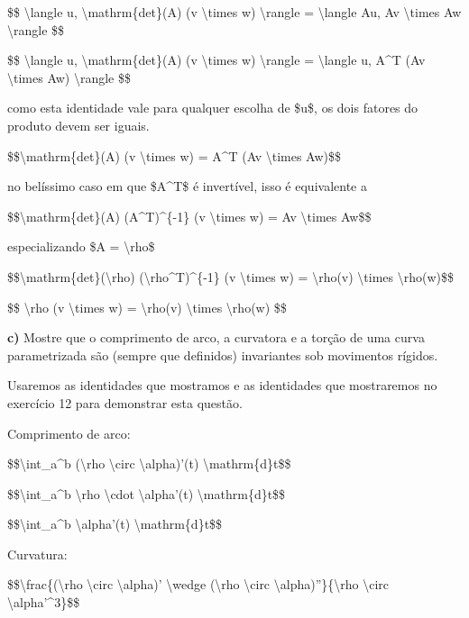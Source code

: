 \$\$ \textbackslash{}langle u, \textbackslash{}mathrm\{det\}(A) (v
\textbackslash{}times w) \textbackslash{}rangle = \textbackslash{}langle
Au, Av \textbackslash{}times Aw \textbackslash{}rangle \$\$

\$\$ \textbackslash{}langle u, \textbackslash{}mathrm\{det\}(A) (v
\textbackslash{}times w) \textbackslash{}rangle = \textbackslash{}langle
u, A\^{}T (Av \textbackslash{}times Aw) \textbackslash{}rangle \$\$

como esta identidade vale para qualquer escolha de \$u\$, os dois
fatores do produto devem ser iguais.

\$\$\textbackslash{}mathrm\{det\}(A) (v \textbackslash{}times w) =
A\^{}T (Av \textbackslash{}times Aw)\$\$

no belíssimo caso em que \$A\^{}T\$ é invertível, isso é equivalente a

\$\$\textbackslash{}mathrm\{det\}(A) (A\^{}T)\^{}\{-1\} (v
\textbackslash{}times w) = Av \textbackslash{}times Aw\$\$

especializando \$A = \textbackslash{}rho\$

\$\$\textbackslash{}mathrm\{det\}(\textbackslash{}rho)
(\textbackslash{}rho\^{}T)\^{}\{-1\} (v \textbackslash{}times w) =
\textbackslash{}rho(v) \textbackslash{}times \textbackslash{}rho(w)\$\$

\$\$ \textbackslash{}rho (v \textbackslash{}times w) =
\textbackslash{}rho(v) \textbackslash{}times \textbackslash{}rho(w) \$\$

\textbf{c)} Mostre que o comprimento de arco, a curvatora e a torção de
uma curva parametrizada são (sempre que definidos) invariantes sob
movimentos rígidos.

Usaremos as identidades que mostramos e as identidades que mostraremos
no exercício 12 para demonstrar esta questão.

Comprimento de arco:

\$\$\textbackslash{}int\_a\^{}b \textbar{}(\textbackslash{}rho
\textbackslash{}circ \textbackslash{}alpha)'(t)\textbar{}
\textbackslash{}mathrm\{d\}t\$\$

\$\$\textbackslash{}int\_a\^{}b \textbar{}\textbackslash{}rho
\textbackslash{}cdot \textbackslash{}alpha'(t)\textbar{}
\textbackslash{}mathrm\{d\}t\$\$

\$\$\textbackslash{}int\_a\^{}b
\textbar{}\textbackslash{}alpha'(t)\textbar{}
\textbackslash{}mathrm\{d\}t\$\$

Curvatura:

\$\$\textbackslash{}frac\{\textbar{}(\textbackslash{}rho
\textbackslash{}circ \textbackslash{}alpha)' \textbackslash{}wedge
(\textbackslash{}rho \textbackslash{}circ
\textbackslash{}alpha)''\textbar{}\}\{\textbar{}\textbackslash{}rho
\textbackslash{}circ \textbackslash{}alpha'\textbar{}\^{}3\}\$\$

